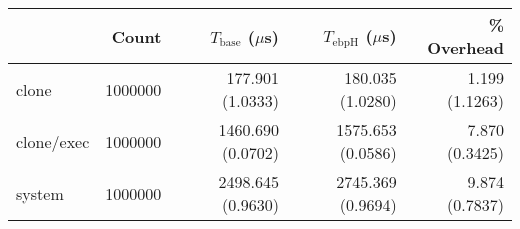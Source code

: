 \begin{tabular}{>{\ttfamily}lrrrr}
\toprule
\multicolumn{1}{l}{Test} &    Count & $T_{\text{base}}$ ($\mu$s) & $T_{\text{ebpH}}$ ($\mu$s) &     \% Overhead \\
\midrule
                   clone &  1000000 &           177.901 (1.0333) &           180.035 (1.0280) &  1.199 (1.1263) \\
              clone/exec &  1000000 &          1460.690 (0.0702) &          1575.653 (0.0586) &  7.870 (0.3425) \\
                  system &  1000000 &          2498.645 (0.9630) &          2745.369 (0.9694) &  9.874 (0.7837) \\
\bottomrule
\end{tabular}
